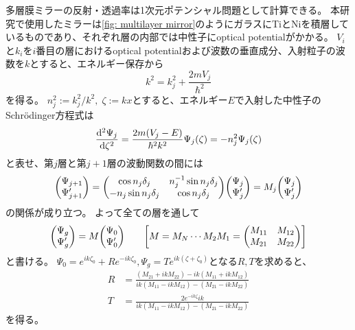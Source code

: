 \documentclass[dvipdfmx]{jsarticle}
\begin{document}
多層膜ミラーの反射・透過率は1次元ポテンシャル問題として計算できる。
本研究で使用したミラーは\ref{fig: multilayer mirror}のようにガラスにTiとNiを積層しているものであり、それぞれ層の内部では中性子にoptical potentialがかかる。\cite{SekY:2011}
$V_i$と$k_i$を$i$番目の層におけるoptical potentialおよび波数の垂直成分、入射粒子の波数を$k$とすると、エネルギー保存から
\begin{equation*}
    k^2
    =
    k_j^2
    +
    \frac{2mV_j}{\hbar^2}
\end{equation*}
を得る。
$n_j^2:={k_j^2}/{k^2},\;\zeta:=kx$とすると、エネルギー$E$で入射した中性子のSchrödinger方程式は
\begin{equation*}
    \dv[2]{\Psi_j}{\zeta}
    =
    \frac{2m(V_j-E)}{\hbar^2k^2}\Psi_j(\zeta)
    =
    -n_j^2\Psi_j(\zeta)
\end{equation*}
と表せ、第$j$層と第$j+1$層の波動関数の間には
\begin{equation*}
    \mqty(\Psi_{j+1} \\ \Psi_{j+1}')
    =
    \mqty(
        \cos n_j\delta_j & n_j^{-1}\sin n_j\delta_j
        \\
        -n_j\sin n_j\delta_j & \cos n_j\delta_j
    )
    \mqty(\Psi_j \\ \Psi_j')
    =
    M_j
    \mqty(\Psi_j \\ \Psi_j')
\end{equation*}
の関係が成り立つ。
よって全ての層を通して
\begin{equation*}
    \mqty(\Psi_g \\ \Psi_g')
    =
    M
    \mqty(\Psi_0 \\ \Psi_0')
    \qquad
    \qty[
        M=M_N\cdots M_2M_1
        =
        \mqty(M_{11} & M_{12} \\ M_{21} & M_{22})
    ]
\end{equation*}
と書ける。
$\Psi_0=e^{ik\zeta_0}+Re^{-ik\zeta_0}, \Psi_g=Te^{ik(\zeta+\zeta_0)}$となる$R, T$を求めると、
\begin{equation}
    \label{eq: theoretical: R and T}
    \begin{split}
        R
        &=
        \frac{(M_{21}+ikM_{22})-ik(M_{11}+ikM_{12})}{ik(M_{11}-ikM_{12})-(M_{21}-ikM_{22})}
        \\
        T
        &=
        \frac{2e^{-ik\zeta}ik}{ik(M_{11}-ikM_{12})-(M_{21}-ikM_{22})}
    \end{split}
\end{equation}
を得る。
\end{document}
